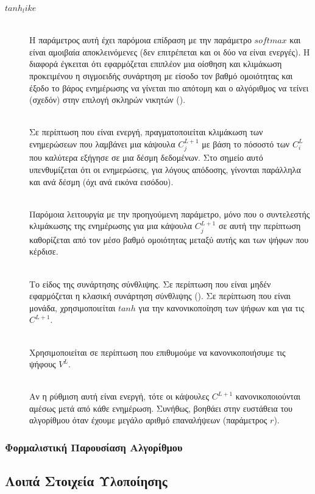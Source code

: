 \begin{description}
  \item[$tanh_like$] \hfill \\
  Η παράμετρος αυτή έχει παρόμοια επίδραση με την παράμετρο $softmax$ και είναι αμοιβαία αποκλεινόμενες (δεν επιτρέπεται και οι δύο να είναι ενεργές). Η διαφορά έγκειται ότι εφαρμόζεται επιπλέον μια οίσθηση και κλιμάκωση προκειμένου η σιγμοειδής συνάρτηση με είσοδο τον βαθμό ομοιότητας και έξοδο το βάρος ενημέρωσης να γίνεται πιο απότομη και ο αλγόριθμος να τείνει (σχεδόν) στην επιλογή σκληρών νικητών ().
  \item[] \hfill \\
  Σε περίπτωση που είναι ενεργή, πραγματοποιείται κλιμάκωση των ενημερώσεων που λαμβάνει μια κάψουλα $C^{L+1}_j$ με βάση το πόσοστό των $C^L_i$ που καλύτερα εξήγησε σε μια δέσμη δεδομένων. Στο σημείο αυτό υπενθυμίζεται ότι οι ενημερώσεις, για λόγους απόδοσης, γίνονται παράλληλα και ανά δέσμη (όχι ανά εικόνα εισόδου).
  \item[] \hfill \\
  Παρόμοια λειτουργία με την προηγούμενη παράμετρο, μόνο που ο συντελεστής κλιμάκωσης της ενημέρωσης για μια κάψουλα $C_j^{L+1}$ σε αυτή την περίπτωση καθορίζεται από τον μέσο βαθμό ομοιότητας μεταξύ αυτής και των ψήφων που κέρδισε.
  \item[] \hfill \\
  Το είδος της συνάρτησης σύνθλιψης. Σε περίπτωση που είναι μηδέν εφαρμόζεται η κλασική συνάρτηση σύνθλιψης (). Σε περίπτωση που είναι μονάδα, χρησιμοποιείται $tanh$  για την κανονικοποίηση των ψήφων και  για τις $C^{L+1}$.
  \item[] \hfill \\
  Χρησιμοποιείται σε περίπτωση που επιθυμούμε να κανονικοποιήσυμε τις ψήφους $V^L$.
  \item[] \hfill \\
  Αν η ρύθμιση αυτή είναι ενεργή, τότε οι κάψουλες $C^{L+1}$ κανονικοποιούνται αμέσως μετά από κάθε ενημέρωση. Συνήθως, βοηθάει στην ευστάθεια του αλγορίθμου όταν έχουμε μεγάλο αριθμό επαναλήψεων (παράμετρος $r$).
\end{description}

\subsubsection{Φορμαλιστική Παρουσίαση Αλγορίθμου}




\subsection{Λοιπά Στοιχεία Υλοποίησης}